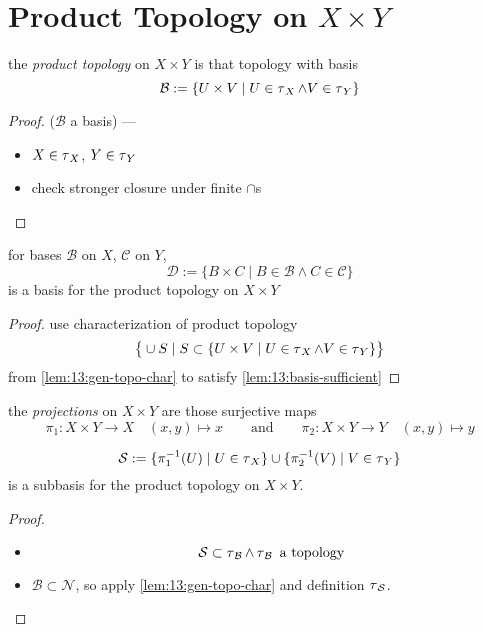 \section{Product Topology on $X\times Y$}

\begin{defn}
  the \emph{product topology} on $X\times Y$ is that topology
  with basis
  \[ \mathcal B:= \{U\times V\mid U\in\operatorname{\tau}_X\land V\in\operatorname{\tau}_Y\} \]
\end{defn}
\begin{proof}
  ($\mathcal B$ a basis) ---
  \begin{itemize}
  \item[\ref{defn:13:basis:itm:union}]
    $X\in\operatorname{\tau}_X$, $Y\in\operatorname{\tau}_Y$
  \item[\ref{defn:13:basis:itm:closure-like}]
    check stronger closure under finite $\cap$s
  \end{itemize}
\end{proof}

\begin{thm}\label{thm:15.1}\label{thm:15:fin-prod-basis}
  for bases $\mathcal B$ on $X$, $\mathcal C$ on $Y$,
  \[
  \mathcal D :=
  \{B\times C\mid B\in\mathcal B\land C\in\mathcal C\}
  \]
  is a basis for the product topology on $X\times Y$
\end{thm}
\begin{proof}
  use characterization of product topology
  \[
  \big\{\cup S\mid
  S\subset\{U\times V\mid U\in\operatorname{\tau}_X\land V\in\operatorname{\tau}_Y\}
  \big\}
  \]
  from \ref{lem:13:gen-topo-char} to satisfy
  \ref{lem:13:basis-sufficient}
\end{proof}

\begin{defn}
  the \emph{projections} on $X\times Y$ are those surjective maps
  \[
  \pi_1: X\times Y\rightarrow X\quad (x, y)\mapsto x
  \qquad\text{and}\qquad
  \pi_2: X\times Y\rightarrow Y\quad (x, y)\mapsto y
  \]
\end{defn}

\begin{thm}\label{thm:15.2}\label{thm:15:fin-prod-subbasis}
  \[
  \mathcal S := \{\pi_1^{-1}(U)\mid U\in\operatorname{\tau}_X\} \cup
  \{\pi_2^{-1}(V)\mid V\in\operatorname{\tau}_Y\}
  \]
  is a subbasis for the product topology on $X\times Y$.
\end{thm}
\begin{proof}
  \begin{itemize}
  \item[($\topo_{\mathcal S}\subset\topo_{\mathcal B}$):]
    \[
    \mathcal S\subset\operatorname{\tau}_{\mathcal B}
    \land
    \operatorname{\tau}_{\mathcal B}\text{ a topology}
    \]
  \item[($\topo_{\mathcal B}\subset\topo_{\mathcal S}$):]
    $\mathcal B\subset\mathcal N$, so apply \ref{lem:13:gen-topo-char}
    and definition $\operatorname{\tau}_{\mathcal S}$.
  \end{itemize}
\end{proof}
